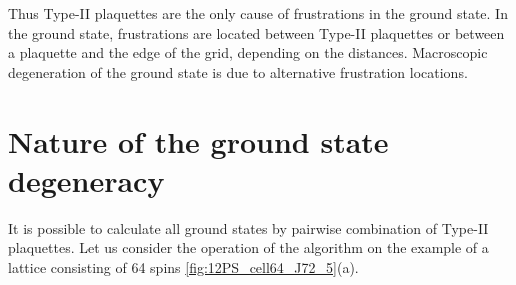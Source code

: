 \documentclass[preprint,12pt]{elsarticle}
\begin{document}
	Thus Type-II plaquettes are the only cause of frustrations in the ground state. In the ground state, frustrations are located between Type-II plaquettes or between a plaquette and the edge of the grid, depending on the distances. Macroscopic degeneration of the ground state is due to alternative frustration locations.
	
	\section{Nature of the ground state degeneracy}
	
	It is possible to calculate all ground states by pairwise combination of Type-II plaquettes. Let us consider the operation of the algorithm on the example of a lattice consisting of 64 spins \ref{fig:12PS_cell64_J72_5}(a).
	
\end{document}
